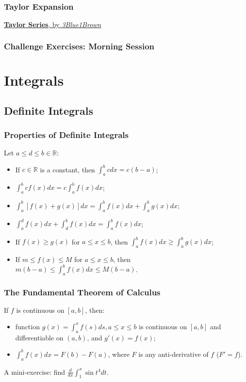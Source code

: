 \documentclass{beamer}
\begin{document}
\begin{frame}
\frametitle{Taylor Expansion}

\href{https://youtu.be/3d6DsjIBzJ4}{\textbf{Taylor Series}, by \textit{3Blue1Brown}}
\end{frame}

\begin{frame}
\frametitle{Challenge Exercises: Morning Session}
\end{frame}


\section{Integrals}
\subsection{Definite Integrals}
\begin{frame}
\frametitle{Properties of Definite Integrals}
Let $a \leq d \leq b \in \mathbb{R}$:
\begin{itemize}
\item If $c \in \mathbb{R}$ is a constant, then $\int_{a}^b c dx = c(b-a)$;
\item $\int_{a}^b cf(x) dx = c\int_{a}^b f(x) dx$;
\item $\int_{a}^b [f(x)+g(x)] dx = \int_{a}^b f(x) dx + \int_{a}^b g(x) dx$;
\item $\int_{a}^d f(x) dx + \int_{d}^b f(x) dx = \int_{a}^b f(x) dx$;
\item If $f(x) \geq g(x)$ for $a \leq x \leq b$, then $\int_{a}^b f(x) dx \geq \int_{a}^b g(x) dx$;
\item If $m \leq f(x) \leq M$ for $a \leq x \leq b$, then $m(b-a) \leq \int_{a}^b f(x) dx \leq M(b-a)$.
\end{itemize}
\end{frame}

\begin{frame}
\frametitle{The Fundamental Theorem of Calculus}
If $f$ is continuous on $[a,b]$, then:
\begin{itemize}
\item function $g(x) = \int_a^x f(s) ds, a\leq x \leq b$ is continuous on $[a,b]$ and differentiable on $(a,b)$, and $g'(x) = f(x)$;
\item $\int_a^b f(x)dx = F(b)-F(a)$, where $F$ is any anti-derivative of $f$ ($F' = f$).
\end{itemize}
\vspace*{0.15in}
A mini-exercise: 
find $\frac{d}{dx}\int_1^x \sin t^4 dt$.

\end{frame}
\end{document}
